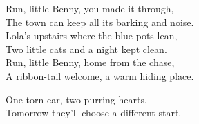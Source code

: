 \begin{lyrics}
Run, little Benny, you made it through,\\
The town can keep all its barking and noise.\\
Lola's upstairs where the blue pots lean,\\
Two little cats and a night kept clean.\\
Run, little Benny, home from the chase,\\
A ribbon-tail welcome, a warm hiding place.

One torn ear, two purring hearts,\\
Tomorrow they'll choose a different start.
\end{lyrics}

